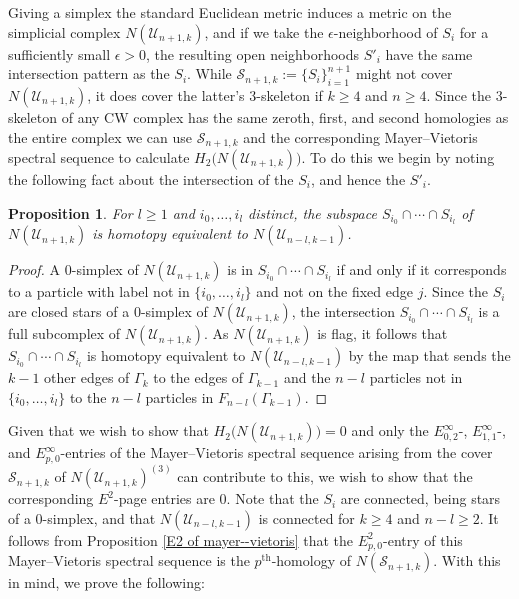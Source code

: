 \documentclass[pagebackref,colorlinks,citecolor=blue,linkcolor=blue,urlcolor=blue,filecolor=blue]{article}
\newtheorem{prop}[thm]{Proposition}
\theoremstyle{definition}\newtheorem{definition}[thm]{Definition}
\theoremstyle{definition}
\begin{document}
Giving a simplex the standard Euclidean metric induces a metric on the simplicial complex $N(\mathcal{U}_{n+1, k})$, and if we take the $\epsilon$-neighborhood of $S_{i}$ for a sufficiently small $\epsilon>0$, the resulting open neighborhoods $S'_{i}$ have the same intersection pattern as the $S_{i}$.
While $\mathcal{S}_{n+1, k}:=\{S_{i}\}_{i=1}^{n+1}$ might not cover $N(\mathcal{U}_{n+1, k})$, it does cover the latter's $3$-skeleton if $k\ge 4$ and $n\ge 4$.
Since the $3$-skeleton of any CW complex has the same zeroth, first, and second homologies as the entire complex we can use $\mathcal{S}_{n+1, k}$ and the corresponding Mayer--Vietoris spectral sequence to calculate $H_{2}\big(N(\mathcal{U}_{n+1, k})\big)$.
To do this we begin by noting the following fact about the intersection of the $S_{i}$, and hence the $S'_{i}$.

\begin{prop}\label{intersection of stars}
For $l\ge 1$ and $i_{0}, \dots, i_{l}$ distinct, the subspace $S_{i_{0}}\cap\cdots\cap S_{i_{l}}$ of $N(\mathcal{U}_{n+1, k})$ is homotopy equivalent to $N(\mathcal{U}_{n-l, k-1})$.
\end{prop}

\begin{proof}
A $0$-simplex of $N(\mathcal{U}_{n+1, k})$ is in $S_{i_{0}}\cap\cdots\cap S_{i_{l}}$ if and only if it corresponds to a particle with label not in $\{i_{0}, \dots, i_{l}\}$ and not on the fixed edge $j$. 
Since the $S_{i}$ are closed stars of a $0$-simplex of $N(\mathcal{U}_{n+1, k})$, the intersection $S_{i_{0}}\cap\cdots\cap S_{i_{l}}$ is a full subcomplex of $N(\mathcal{U}_{n+1, k})$.
As $N(\mathcal{U}_{n+1, k})$ is flag, it follows that $S_{i_{0}}\cap\cdots\cap S_{i_{l}}$ is homotopy equivalent to $N(\mathcal{U}_{n-l, k-1})$ by the map that sends the $k-1$ other edges of $\Gamma_{k}$ to the edges of $\Gamma_{k-1}$ and the $n-l$ particles not in $\{i_{0}, \dots, i_{l}\}$ to the $n-l$ particles in $F_{n-l}(\Gamma_{k-1})$.
\end{proof}

Given that we wish to show that $H_{2}\big(N(\mathcal{U}_{n+1, k})\big)=0$ and only the $E^{\infty}_{0,2}$-, $E^{\infty}_{1,1}$-, and $E^{\infty}_{p,0}$-entries of the Mayer--Vietoris spectral sequence arising from the cover $\mathcal{S}_{n+1,k}$ of $N(\mathcal{U}_{n+1, k})^{(3)}$ can contribute to this, we wish to show that the corresponding $E^{2}$-page entries are $0$.
Note that the $S_{i}$ are connected, being stars of a $0$-simplex, and that $N(\mathcal{U}_{n-l, k-1})$ is connected for $k\ge 4$ and $n-l\ge 2$.
It follows from Proposition \ref{E2 of mayer--vietoris} that the $E^{2}_{p,0}$-entry of this Mayer--Vietoris spectral sequence is the $p^{\text{th}}$-homology of $N(\mathcal{S}_{n+1, k})$.
With this in mind, we prove the following:
\end{document}
